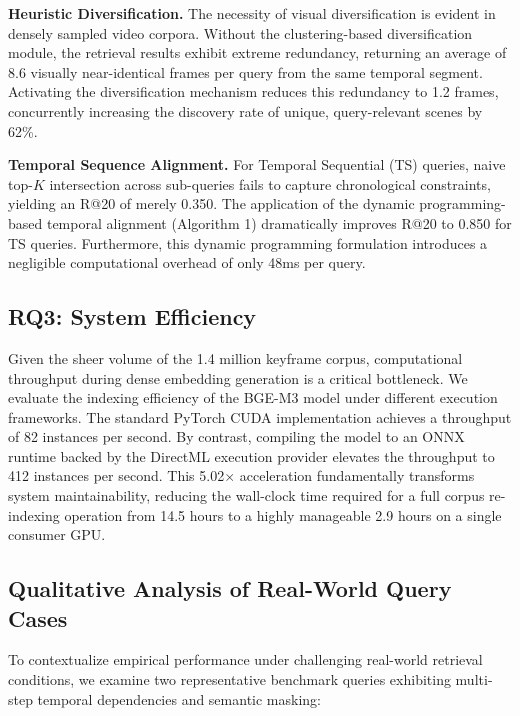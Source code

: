 \textbf{Heuristic Diversification.} The necessity of visual diversification is evident in densely sampled video corpora. Without the clustering-based diversification module, the retrieval results exhibit extreme redundancy, returning an average of 8.6 visually near-identical frames per query from the same temporal segment. Activating the diversification mechanism reduces this redundancy to 1.2 frames, concurrently increasing the discovery rate of unique, query-relevant scenes by 62\%.

\textbf{Temporal Sequence Alignment.} For Temporal Sequential (TS) queries, naive top-$K$ intersection across sub-queries fails to capture chronological constraints, yielding an R@20 of merely 0.350. The application of the dynamic programming-based temporal alignment (Algorithm 1) dramatically improves R@20 to 0.850 for TS queries. Furthermore, this dynamic programming formulation introduces a negligible computational overhead of only 48ms per query.

\subsection{RQ3: System Efficiency}

Given the sheer volume of the 1.4 million keyframe corpus, computational throughput during dense embedding generation is a critical bottleneck. We evaluate the indexing efficiency of the BGE-M3 model under different execution frameworks. The standard PyTorch CUDA implementation achieves a throughput of 82 instances per second. By contrast, compiling the model to an ONNX runtime backed by the DirectML execution provider elevates the throughput to 412 instances per second. This 5.02$\times$ acceleration fundamentally transforms system maintainability, reducing the wall-clock time required for a full corpus re-indexing operation from 14.5 hours to a highly manageable 2.9 hours on a single consumer GPU.

\subsection{Qualitative Analysis of Real-World Query Cases}

To contextualize empirical performance under challenging real-world retrieval conditions, we examine two representative benchmark queries exhibiting multi-step temporal dependencies and semantic masking:

